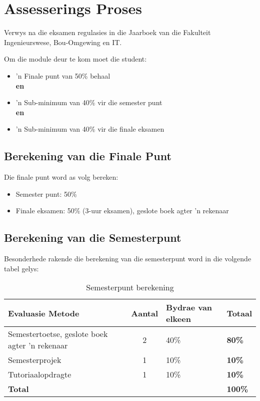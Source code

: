 \section{Assesserings Proses}
Verwys na die eksamen regulasies in die Jaarboek van die Fakulteit
Ingenieurswese, Bou-Omgewing en IT.

Om die module deur te kom moet die student:
    \begin{itemize}
        \item 'n Finale punt van 50\% behaal \\ {\bf en}
        \item 'n Sub-minimum van 40\% vir die semester punt \\ {\bf en}
        \item 'n Sub-minimum van 40\% vir die finale eksamen
    \end{itemize}
    
    \subsection{Berekening van die Finale Punt}
        Die finale punt word as volg bereken:
        \begin{itemize}
            \item Semester punt: 50\%
            \item Finale eksamen: 50\% (3-uur eksamen), geslote boek
              agter 'n rekenaar
        \end{itemize}

    \subsection{Berekening van die Semesterpunt}
    Besonderhede rakende die berekening van die semesterpunt word in
    die volgende tabel gelys:
        \begin{table}[!h]
            \begin{center}
             \begin{tabular}{|p{5cm}|c|l|l|}
               \hline
               {\bf Evaluasie Metode} & {\bf Aantal} & 
               {\bf Bydrae van elkeen} & {\bf Totaal} \\
               \hline
               Semestertoetse, geslote boek
               agter 'n rekenaar
               & 2 & 40\% & {\bf 80\%} \\ \hline
               Semesterprojek 
               & 1 & 10\% & {\bf 10\%} \\
               Tutoriaalopdragte
               & 1 & 10\% & {\bf 10\%} \\
               \hline
               \multicolumn{3}{|l|}{{\bf Total}} & {\bf 100\%} \\
               \hline
             \end{tabular}
             \caption{Semesterpunt berekening}
            \end{center}
        \end{table}
    
